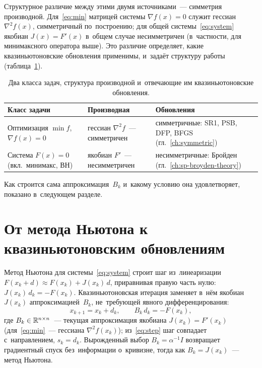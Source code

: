 Структурное различие между этими двумя источниками~--- симметрия
производной. Для~\eqref{eq:min} матрицей системы $\nabla f(x)=0$ служит
гессиан $\nabla^2 f(x)$, симметричный по~построению; для общей
системы~\eqref{eq:system} якобиан $J(x)=F'(x)$ в~общем случае
несимметричен (в~частности, для минимаксного оператора выше). Это
различие определяет, какие квазиньютоновские обновления применимы,
и~задаёт структуру работы (таблица~\ref{tab:ch1_classes}).

\begin{table}[h]
\centering
\caption{Два класса задач, структура производной и~отвечающие им
квазиньютоновские обновления.}\label{tab:ch1_classes}
\renewcommand{\arraystretch}{1.3}
\begin{tabular}{@{}p{4.4cm} p{3.9cm} p{4.4cm}@{}}
\toprule
Класс задачи & Производная & Обновления \\
\midrule
Оптимизация $\min f$,\newline $\nabla f(x)=0$
  & гессиан $\nabla^2 f$~--- симметричен
  & симметричные: SR1, PSB, DFP, BFGS (гл.~\ref{ch:symmetric}) \\
Система $F(x)=0$\newline (вкл.\ минимакс, ВН)
  & якобиан $F'$~--- несимметричен
  & несимметричные: Бройден (гл.~\ref{ch:sp-broyden-theory}) \\
\bottomrule
\end{tabular}
\end{table}

Как строится сама аппроксимация~$B_k$ и~какому условию она
удовлетворяет, показано в~следующем разделе.


\section{От метода Ньютона к квазиньютоновским обновлениям}\label{sec:ch1_newton}

Метод Ньютона для системы~\eqref{eq:system} строит шаг из~линеаризации
$F(x_k+d)\approx F(x_k)+J(x_k)\,d$, приравнивая правую часть нулю:
$J(x_k)\,d_k=-F(x_k)$. Квазиньютоновская итерация заменяет в~нём
якобиан~$J(x_k)$ аппроксимацией~$B_k$, не~требующей явного
дифференцирования:
\begin{equation}\label{eq:step}
  x_{k+1} = x_k + d_k, \qquad B_k\,d_k = -F(x_k),
\end{equation}
где $B_k \in \mathbb{R}^{n \times n}$~--- текущая аппроксимация якобиана
$J(x_k) = F'(x_k)$ (для~\eqref{eq:min}~--- гессиана $\nabla^2 f(x_k)$);
из~\eqref{eq:step} шаг совпадает с~направлением, $s_k=d_k$. Вырожденный
выбор $B_k=\alpha^{-1}I$ возвращает градиентный спуск без~информации
о~кривизне, тогда как $B_k=J(x_k)$~--- метод Ньютона.

